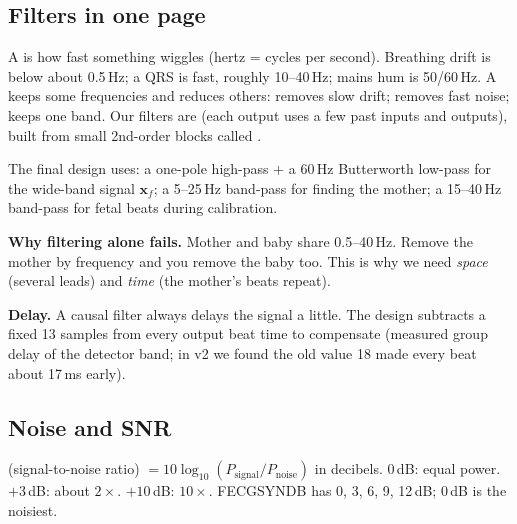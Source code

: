 \documentclass[11pt]{article}
\begin{document}
\subsection{Filters in one page}
A  is how fast something wiggles (hertz = cycles per second). Breathing drift is below about 0.5\,Hz; a QRS is fast, roughly 10--40\,Hz; mains hum is 50/60\,Hz. A  keeps some frequencies and reduces others:  removes slow drift;  removes fast noise;  keeps one band. Our filters are  (each output uses a few past inputs and outputs), built from small 2nd-order blocks called .

The final design uses: a one-pole high-pass + a 60\,Hz Butterworth low-pass for the wide-band signal $\mathbf{x}_f$; a 5--25\,Hz band-pass for finding the mother; a 15--40\,Hz band-pass for fetal beats during calibration.

\textbf{Why filtering alone fails.} Mother and baby share 0.5--40\,Hz. Remove the mother by frequency and you remove the baby too. This is why we need \emph{space} (several leads) and \emph{time} (the mother's beats repeat).

\textbf{Delay.} A causal filter always delays the signal a little. The design subtracts a fixed 13 samples from every output beat time to compensate (measured group delay of the detector band; in v2 we found the old value 18 made every beat about 17\,ms early).

\subsection{Noise and SNR}
 (signal-to-noise ratio) $= 10\log_{10}(P_\text{signal}/P_\text{noise})$ in decibels. 0\,dB: equal power. $+3$\,dB: about $2\times$. $+10$\,dB: $10\times$. FECGSYNDB has 0, 3, 6, 9, 12\,dB; 0\,dB is the noisiest.
\end{document}
